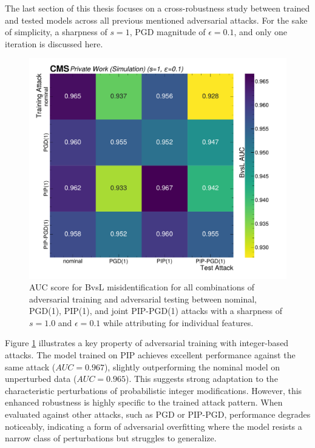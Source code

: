 The last section of this thesis focuses on a cross-robustness study between trained and tested models across all previous mentioned adversarial attacks. For the sake of simplicity, a sharpness of $s=1$, PGD magnitude of $\epsilon=0.1$, and only one iteration is discussed here.

\begin{figure}[h]
\centering
    \includegraphics[width=15cm]{media/cross_robustness.pdf}
    \caption{AUC score for BvsL misidentification for all combinations of adversarial training and adversarial testing between nominal, PGD(1), PIP(1), and joint PIP-PGD(1) attacks with a sharpness of $s=1.0$ and $\epsilon=0.1$ while attributing for individual features.}
    \label{fig:cross_robustness}
\end{figure}

Figure \ref{fig:cross_robustness} illustrates a key property of adversarial training with integer-based attacks. The model trained on PIP achieves excellent performance against the same attack ($AUC = 0.967$), slightly outperforming the nominal model on unperturbed data ($AUC = 0.965$). This suggests strong adaptation to the characteristic perturbations of probabilistic integer modifications. However, this enhanced robustness is highly specific to the trained attack pattern. When evaluated against other attacks, such as PGD or PIP-PGD, performance degrades noticeably, indicating a form of adversarial overfitting where the model resists a narrow class of perturbations but struggles to generalize.

